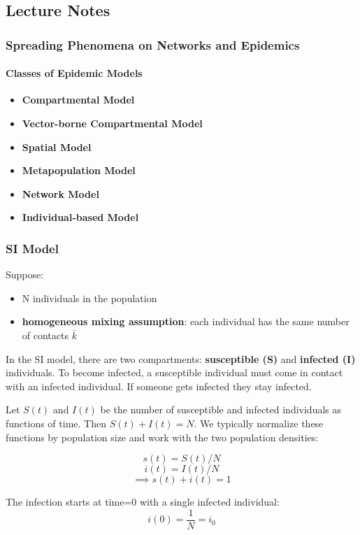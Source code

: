 \documentclass[11pt]{scrartcl} %
\begin{document}
\subsection{Lecture Notes}

\subsubsection{Spreading Phenomena on Networks and Epidemics}
\paragraph{Classes of Epidemic Models}
\begin{itemize}
	\item \textbf{Compartmental Model}
	\item \textbf{Vector-borne Compartmental Model}
	\item \textbf{Spatial Model}
	\item \textbf{Metapopulation Model}
	\item \textbf{Network Model}
	\item \textbf{Individual-based Model}
\end{itemize}

\subsubsection{SI Model}
Suppose:
\begin{itemize}
	\item N individuals in the population
	\item \textbf{homogeneous mixing assumption}: each individual has the same number of contacts $\bar{k}$
\end{itemize}

In the SI model, there are two compartments: \textbf{susceptible (S)} and \textbf{infected (I)} individuals. To become infected, a susceptible individual must come in contact with an infected individual. If someone gets infected they stay infected.

Let $S(t)$ and $I(t)$ be the number of susceptible and infected individuals as functions of time. Then $S(t) + I(t) = N$. We typically normalize these functions by population size and work with the two population densities: 

	\[ s(t) = S(t)/N \]
	\[ i(t) = I(t)/N \]
	\[ \implies s(t) + i(t) = 1 \]

The infection starts at time=0 with a single infected individual:
\[i(0) = \frac{1}{N} = i_0 \]
\end{document}
